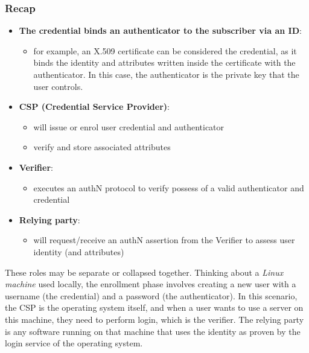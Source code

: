 \subsubsection{Recap}
\begin{itemize}
	\item \textbf{The credential binds an authenticator to the subscriber via an ID}:
	      \begin{itemize}
		      \item for example, an X.509 certificate can be considered the credential, as it binds the identity and attributes written inside the certificate with the authenticator. In this case, the authenticator is the private key that the user controls.
	      \end{itemize}
	\item \textbf{CSP (Credential Service Provider)}:
	      \begin{itemize}
		      \item will issue or enrol user credential and authenticator
		      \item verify and store associated attributes
	      \end{itemize}
	\item \textbf{Verifier}:
	      \begin{itemize}
		      \item executes an authN protocol to verify possess of a valid
		            authenticator and credential
	      \end{itemize}
	\item \textbf{Relying party}:
	      \begin{itemize}
		      \item will request/receive an authN assertion from the Verifier to
		            assess user identity (and attributes)
	      \end{itemize}
\end{itemize}


These roles may be separate or collapsed together.
Thinking about a \emph{Linux machine} used locally, the enrollment phase involves creating a new user with a username (the credential) and a password (the authenticator). In this scenario, the CSP is the operating system itself, and when a user wants to use a server on this machine, they need to perform login, which is the verifier. The relying party is any software running on that machine that uses the identity as proven by the login service of the operating system.



